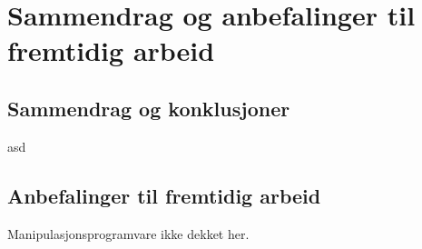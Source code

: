 \section[Sammendrag]{Sammendrag og anbefalinger til fremtidig arbeid}
\subsection{Sammendrag og konklusjoner}
asd
\subsection{Anbefalinger til fremtidig arbeid}
Manipulasjonsprogramvare ikke dekket her.
